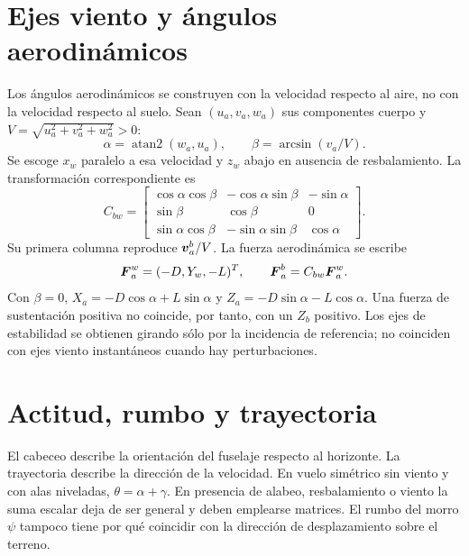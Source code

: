 \section{Ejes viento y ángulos aerodinámicos}
Los ángulos aerodinámicos se construyen con la velocidad respecto al aire, no con la velocidad respecto al suelo. Sean $(u_a,v_a,w_a)$ sus componentes cuerpo y $V=\sqrt{u_a^2+v_a^2+w_a^2}>0$:
\begin{equation}
\alpha=\operatorname{atan2}(w_a,u_a),\qquad \beta=\arcsin(v_a/V).
\end{equation}
Se escoge $x_w$ paralelo a esa velocidad y $z_w$ abajo en ausencia de resbalamiento. La transformación correspondiente es
\begin{equation}
C_{bw}=\begin{bmatrix}
\cos\alpha\cos\beta&-\cos\alpha\sin\beta&-\sin\alpha\\
\sin\beta&\cos\beta&0\\
\sin\alpha\cos\beta&-\sin\alpha\sin\beta&\cos\alpha
\end{bmatrix}.\label{eq:Cbw}
\end{equation}
Su primera columna reproduce $\boldsymbol{v}_a^b/V$. La fuerza aerodinámica se escribe
\begin{equation}
\boldsymbol{F}_a^w=(-D,Y_w,-L)^T,\qquad \boldsymbol{F}_a^b=C_{bw}\boldsymbol{F}_a^w.
\end{equation}
Con $\beta=0$, $X_a=-D\cos\alpha+L\sin\alpha$ y $Z_a=-D\sin\alpha-L\cos\alpha$. Una fuerza de sustentación positiva no coincide, por tanto, con un $Z_b$ positivo. Los ejes de estabilidad se obtienen girando sólo por la incidencia de referencia; no coinciden con ejes viento instantáneos cuando hay perturbaciones.

\section{Actitud, rumbo y trayectoria}
El cabeceo describe la orientación del fuselaje respecto al horizonte. La trayectoria describe la dirección de la velocidad. En vuelo simétrico sin viento y con alas niveladas, $\theta=\alpha+\gamma$. En presencia de alabeo, resbalamiento o viento la suma escalar deja de ser general y deben emplearse matrices. El rumbo del morro $\psi$ tampoco tiene por qué coincidir con la dirección de desplazamiento sobre el terreno.

